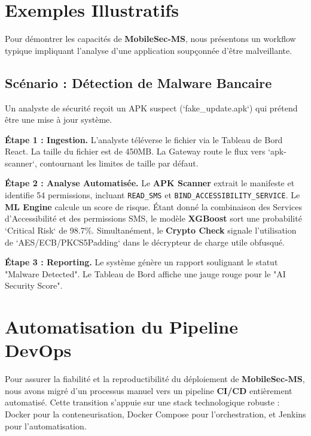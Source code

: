 \documentclass[
  journal=largetwo,
  manuscript=article-type,
  year=2025,
  volume=1,
]{cup-journal}
\begin{document}
\section{Exemples Illustratifs}
\label{sec-examples}

Pour démontrer les capacités de \textbf{MobileSec-MS}, nous présentons un workflow typique impliquant l'analyse d'une application soupçonnée d'être malveillante.

\subsection{Scénario : Détection de Malware Bancaire}
Un analyste de sécurité reçoit un APK suspect (`fake\_update.apk`) qui prétend être une mise à jour système.

\textbf{Étape 1 : Ingestion.} L'analyste téléverse le fichier via le Tableau de Bord React. La taille du fichier est de 450MB. La Gateway route le flux vers `apk-scanner`, contournant les limites de taille par défaut.

\textbf{Étape 2 : Analyse Automatisée.} Le \textbf{APK Scanner} extrait le manifeste et identifie 54 permissions, incluant \texttt{READ\_SMS} et \texttt{BIND\_ACCESSIBILITY\_SERVICE}. Le \textbf{ML Engine} calcule un score de risque. Étant donné la combinaison des Services d'Accessibilité et des permissions SMS, le modèle \textbf{XGBoost} sort une probabilité `Critical Risk` de 98.7\%. Simultanément, le \textbf{Crypto Check} signale l'utilisation de `AES/ECB/PKCS5Padding` dans le décrypteur de charge utile obfusqué.

\textbf{Étape 3 : Reporting.} Le système génère un rapport soulignant le statut "Malware Detected". Le Tableau de Bord affiche une jauge rouge pour le "AI Security Score".

\section{Automatisation du Pipeline DevOps}
\label{sec-devops}

Pour assurer la fiabilité et la reproductibilité du déploiement de \textbf{MobileSec-MS}, nous avons migré d'un processus manuel vers un pipeline \textbf{CI/CD} entièrement automatisé. Cette transition s'appuie sur une stack technologique robuste : Docker pour la conteneurisation, Docker Compose pour l'orchestration, et Jenkins pour l'automatisation.
\end{document}
